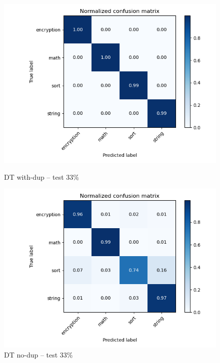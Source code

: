 \documentclass[11pt]{article}
\begin{document}
	\begin{figure}[H]
		\centering
		\begin{minipage}{.5\textwidth}
		  \centering
		  \includegraphics[width=\linewidth]{assets/tree_dup_0.333.png}
		  \caption{DT with-dup -- test 33\%}
		  \label{fig:dt-with-dup-33}
		\end{minipage}%
		\begin{minipage}{.5\textwidth}
		  \centering
		  \includegraphics[width=\linewidth]{assets/tree_nodup_0.333.png}
		  \caption{DT no-dup -- test 33\%}
		\end{minipage}
	\end{figure}
\end{document}
